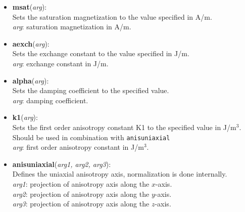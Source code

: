 \begin{itemize}
 \item \textbf{msat}(\textit{arg}):\\
				Sets the saturation magnetization to the value specified in A/m.\\
				\textit{arg}: saturation magnetization in A/m.
 
 \item \textbf{aexch}(\textit{arg}):\\
				Sets the exchange constant to the value specified in J/m.\\
				\textit{arg}: exchange constant in J/m.

 \item \textbf{alpha}(\textit{arg}):\\
				Sets the damping coefficient to the specified value.\\
				\textit{arg}: damping coefficient.

 \item \textbf{k1}(\textit{arg}):\\
				Sets the first order anisotropy constant K1 to the specified value in J/m$^3$.  Should be used in combination with \texttt{anisuniaxial}\\
				\textit{arg}: first order anisotropy constant in J/m$^3$.


 \item \textbf{anisuniaxial}(\textit{arg1, arg2, arg3}):\\
				Defines the uniaxial anisotropy axis, normalization is done internally.\\
				\textit{arg1}: projection of anisotropy axis along the $x$-axis.\\
				\textit{arg2}: projection of anisotropy axis along the $y$-axis.\\
				\textit{arg3}: projection of anisotropy axis along the $z$-axis.


\end{itemize}

